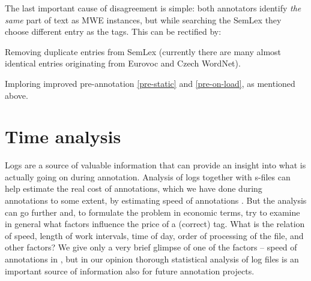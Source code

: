 The last important cause of disagreement is simple: both annotators identify \emph{the same} part of text as MWE instances, but while searching the SemLex they choose different entry as the tags. This can be rectified by:
	\begin{compactitem}
		\item Removing duplicate entries from SemLex (currently there are many almost identical entries originating from Eurovoc and Czech WordNet).
		\item Imploring improved pre-annotation \ref{pre-static} and \ref{pre-on-load}, as mentioned above.
	\end{compactitem}



\section{Time analysis}
\label{sec:time-analysis}
Logs are a source of valuable information that can provide an insight into what is actually going on during annotation. Analysis of logs together with s-files can help estimate the real cost of annotations, which we have done during annotations to some extent, by estimating speed of annotations . 
But the analysis can go further and, to formulate the problem in economic terms, try to examine in general what factors influence the price of a (correct) tag. What is the relation of speed, length of work intervals, time of day, order of processing of the file, and other factors? We give only a very brief glimpse of one of the factors -- speed of annotations in , but in our opinion thorough statistical analysis of log files is an important source of information also for future annotation projects.

